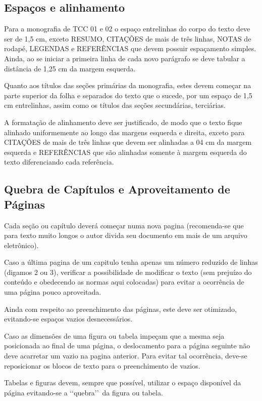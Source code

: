 \subsection{Espaços e alinhamento}

Para a monografia de TCC 01 e 02 o espaço entrelinhas do corpo do texto 
deve ser de 1,5 cm, exceto RESUMO, CITAÇÕES de mais de três linhas, NOTAS 
de rodapé, LEGENDAS e REFERÊNCIAS que devem possuir espaçamento simples. 
Ainda, ao se iniciar a primeira linha de cada novo parágrafo se deve 
tabular a distância de 1,25 cm da margem esquerda.

Quanto aos títulos das seções primárias da monografia, estes devem começar 
na parte superior da folha e separados do texto que o sucede, por um espaço 
de 1,5 cm entrelinhas, assim como os títulos das seções secundárias, 
terciárias. 

A formatação de alinhamento deve ser justificado, de modo que o texto fique 
alinhado uniformemente ao longo das margens esquerda e direita, exceto para 
CITAÇÕES de mais de três linhas que devem ser alinhadas a 04 cm da margem 
esquerda e REFERÊNCIAS que são alinhadas somente à margem esquerda do texto 
diferenciando cada referência.

\subsection{Quebra de Capítulos e Aproveitamento de Páginas}

Cada seção ou capítulo deverá começar numa nova pagina (recomenda-se que 
para texto muito longos o autor divida seu documento em mais de um arquivo 
eletrônico). 

Caso a última pagina de um capitulo tenha apenas um número reduzido de 
linhas (digamos 2 ou 3), verificar a possibilidade de modificar o texto 
(sem prejuízo do conteúdo e obedecendo as normas aqui colocadas) para 
evitar a ocorrência de uma página pouco aproveitada.

Ainda com respeito ao preenchimento das páginas, este deve ser otimizado, 
evitando-se espaços vazios desnecessários. 

Caso as dimensões de uma figura ou tabela impeçam que a mesma seja 
posicionada ao final de uma página, o deslocamento para a página seguinte 
não deve acarretar um vazio na pagina anterior. Para evitar tal ocorrência, 
deve-se reposicionar os blocos de texto para o preenchimento de vazios. 

Tabelas e figuras devem, sempre que possível, utilizar o espaço disponível 
da página evitando-se a \lq\lq quebra\rq\rq\ da figura ou tabela. 

